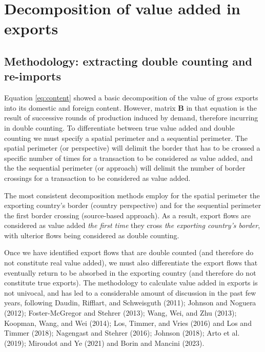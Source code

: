 \hypertarget{decomposition-of-value-added-in-exports}{%
\section{Decomposition of value added in exports}\label{decomposition-of-value-added-in-exports}}

\hypertarget{methodology-extracting-double-counting-and-re-imports}{%
\subsection{Methodology: extracting double counting and re-imports}\label{methodology-extracting-double-counting-and-re-imports}}

Equation \eqref{eq:content} showed a basic decomposition of the value of gross
exports into its domestic and foreign content. However, matrix \(\mathbf{B}\) in
that equation is the result of successive rounds of production induced by
demand, therefore incurring in double counting. To differentiate between true
value added and double counting we must specify a spatial perimeter and a
sequential perimeter. The spatial perimeter (or perspective) will delimit the
border that has to be crossed a specific number of times for a transaction to be
considered as value added, and the the sequential perimeter (or approach) will
delimit the number of border crossings for a transaction to be considered as
value added.

The most consistent decomposition methods employ for the spatial perimeter the
exporting country's border (country perspective) and for the sequential
perimeter the first border crossing (source-based approach). As a result,
export flows are considered as value added \emph{the first time} they cross
\emph{the exporting country's border}, with ulterior flows being considered as
double counting.

Once we have identified export flows that are double counted (and therefore do
not constitute real value added), we must also differentiate the export flows
that eventually return to be absorbed in the exporting country (and therefore do
not constitute true exports). The methodology to calculate value added in
exports is not univocal, and has led to a considerable amount of discussion in
the past few years, following Daudin, Rifflart, and Schweisguth (2011); Johnson and Noguera (2012);
Foster-McGregor and Stehrer (2013); Wang, Wei, and Zhu (2013);
Koopman, Wang, and Wei (2014); Los, Timmer, and Vries (2016) and
Los and Timmer (2018); Nagengast and Stehrer (2016);
Johnson (2018); Arto et al. (2019); Miroudot and Ye (2021) and
Borin and Mancini (2023).

